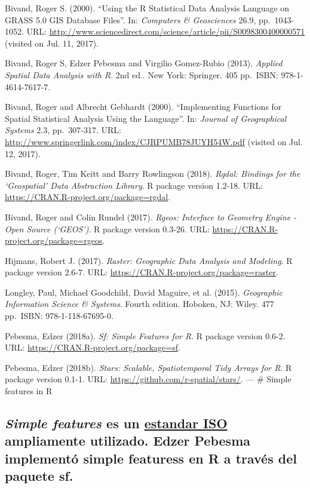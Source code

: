 \documentclass[]{article}
\begin{document}
Bivand, Roger S. (2000). ``Using the R Statistical Data Analysis
Language on GRASS 5.0 GIS Database Files''. In: \emph{Computers \&
Geosciences} 26.9, pp.~1043-1052. URL:
\url{http://www.sciencedirect.com/science/article/pii/S0098300400000571}
(visited on Jul. 11, 2017).

Bivand, Roger S, Edzer Pebesma and Virgilio Gomez-Rubio (2013).
\emph{Applied Spatial Data Analysis with R}. 2nd ed.. New York:
Springer. 405 pp.~ISBN: 978-1-4614-7617-7.

Bivand, Roger and Albrecht Gebhardt (2000). ``Implementing Functions for
Spatial Statistical Analysis Using the Language''. In: \emph{Journal of
Geographical Systems} 2.3, pp.~307-317. URL:
\url{http://www.springerlink.com/index/CJRPUMB78JUYH54W.pdf} (visited on
Jul. 12, 2017).

Bivand, Roger, Tim Keitt and Barry Rowlingson (2018). \emph{Rgdal:
Bindings for the `Geospatial' Data Abstraction Library}. R package
version 1.2-18. URL: \url{https://CRAN.R-project.org/package=rgdal}.

Bivand, Roger and Colin Rundel (2017). \emph{Rgeos: Interface to
Geometry Engine - Open Source (`GEOS')}. R package version 0.3-26. URL:
\url{https://CRAN.R-project.org/package=rgeos}.

Hijmans, Robert J. (2017). \emph{Raster: Geographic Data Analysis and
Modeling}. R package version 2.6-7. URL:
\url{https://CRAN.R-project.org/package=raster}.

Longley, Paul, Michael Goodchild, David Maguire, et al. (2015).
\emph{Geographic Information Science \& Systems}. Fourth edition.
Hoboken, NJ: Wiley. 477 pp.~ISBN: 978-1-118-67695-0.

Pebesma, Edzer (2018a). \emph{Sf: Simple Features for R}. R package
version 0.6-2. URL: \url{https://CRAN.R-project.org/package=sf}.

Pebesma, Edzer (2018b). \emph{Stars: Scalable, Spatiotemporal Tidy
Arrays for R}. R package version 0.1-1. URL:
\url{https://github.com/r-spatial/stars/}. --- \# Simple features in R

\subsection{\texorpdfstring{\textbf{\emph{Simple features}} es un
\href{http://www.opengeospatial.org/standards/sfa}{estandar ISO}
ampliamente utilizado. Edzer Pebesma implementó \textbf{simple
featuress} en R a través del paquete
sf.}{Simple features es un estandar ISO ampliamente utilizado. Edzer Pebesma implementó simple featuress en R a través del paquete sf.}}\label{simple-features-es-un-estandar-iso-ampliamente-utilizado.-edzer-pebesma-implemento-simple-featuress-en-r-a-traves-del-paquete-sf.}
\end{document}
